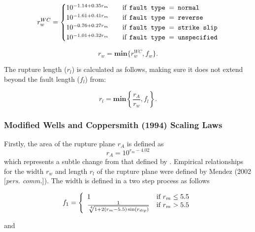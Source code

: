 \begin{equation}\label{rw}
r_w^{WC} = 
\begin{cases}
10^{-1.14 + 0.35r_m}	& \quad \mbox{if \texttt{fault type $=$  normal}} \\
10^{-1.61 + 0.41r_m}	& \quad \mbox{if \texttt{fault type $=$  reverse}} \\
10^{-0.76 + 0.27r_m}	& \quad \mbox{if \texttt{fault type $=$  strike slip}} \\
10^{-1.01 + 0.32r_m}	& \quad \mbox{if \texttt{fault type $=$  unspecified}} \\
\end{cases}
\end{equation}


\begin{equation} \label{eq:rw}
r_w = \mathbf{min}\{r_w^{WC}, f_w\} .
\end{equation}

The rupture length ($r_l$) is calculated as follows, making sure it does not extend beyond the fault length ($f_l$) from:

\begin{equation}
r_l = \mathbf{min}\left\{\frac{r_A}{r_w}, f_l\right\} .
\end{equation}


\subsubsection{Modified Wells and Coppersmith (1994) Scaling Laws}

Firstly, the area of the rupture plane $r_A$ is defined as
\begin{equation}
r_A = 10^{r_m - 4.02}
\end{equation}
which represents a subtle change from that defined by
\citet*{dr_Wells94a}. Empirical relationships for the width $r_w$
and length $r_l$ of the rupture plane were defined by Mendez (2002
[\textit{pers. comm.}]). The width is defined in a two step
process as follows

\begin{equation}
 f_1 = \left \{ \begin{array}{ll}
 1 & \textrm{if $r_m \leq 5.5$} \\
\frac{1}{\sqrt[\leftroot{-2}\uproot{2}4]{1+2(r_m-5.5)\sin(r_{dip})}} & \textrm{if $r_m>5.5$} \\
\end{array} \right.
\end{equation}

and

